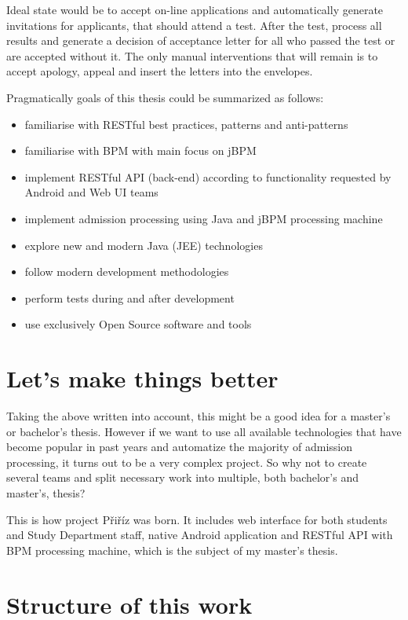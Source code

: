 \begin{introduction}
	Ideal state would be to accept on-line applications and automatically generate invitations for applicants, that should
	attend a test. After the test, process all results and generate a decision of acceptance letter for all who passed the
	test or are accepted without it. The only manual interventions that will remain is to accept apology, appeal and insert
	the letters into the envelopes.

	Pragmatically goals of this thesis could be summarized as follows:
	
	\begin{itemize}
	  \item familiarise with RESTful best practices, patterns and anti-patterns
	  \item familiarise with \gls{BPM} with main focus on jBPM
	  \item implement RESTful \gls{API} (back-end) according to functionality requested by Android and Web UI teams
	  \item implement admission processing using Java and jBPM processing machine
	  \item explore new and modern Java (JEE) technologies
	  \item follow modern development methodologies
	  \item perform tests during and after development
	  \item use exclusively Open Source software and tools
	\end{itemize}
	
	\section{Let's make things better}
	
	Taking the above written into account, this might be a good idea for a master's or bachelor's thesis. However if we
	want to use all available technologies that have become popular in past years and automatize the majority of admission
	processing, it turns out to be a very complex project. So why not to create several teams and split necessary work into
	multiple, both bachelor's and master's, thesis?
	
	This is how project Přiříz was born. It includes web interface for both students and Study Department staff, native
	Android application and RESTful \gls{API} with \gls{BPM} processing machine, which is the subject of my master's thesis.
	
	\section{Structure of this work}
	

\end{introduction}
